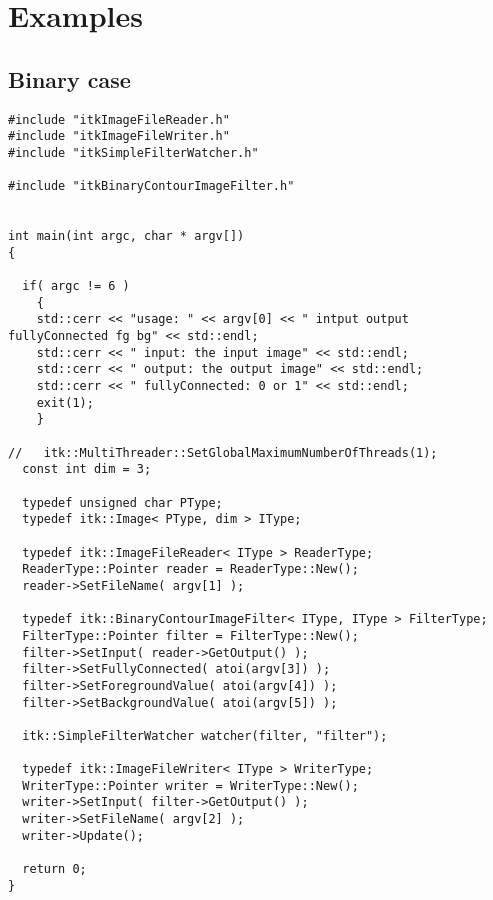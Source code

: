 \documentclass{InsightArticle}
\begin{document}
\section{Examples}
\subsection{Binary case}

\small \begin{verbatim}
#include "itkImageFileReader.h"
#include "itkImageFileWriter.h"
#include "itkSimpleFilterWatcher.h"

#include "itkBinaryContourImageFilter.h"


int main(int argc, char * argv[])
{

  if( argc != 6 )
    {
    std::cerr << "usage: " << argv[0] << " intput output fullyConnected fg bg" << std::endl;
    std::cerr << " input: the input image" << std::endl;
    std::cerr << " output: the output image" << std::endl;
    std::cerr << " fullyConnected: 0 or 1" << std::endl;
    exit(1);
    }

//   itk::MultiThreader::SetGlobalMaximumNumberOfThreads(1);
  const int dim = 3;
  
  typedef unsigned char PType;
  typedef itk::Image< PType, dim > IType;

  typedef itk::ImageFileReader< IType > ReaderType;
  ReaderType::Pointer reader = ReaderType::New();
  reader->SetFileName( argv[1] );

  typedef itk::BinaryContourImageFilter< IType, IType > FilterType;
  FilterType::Pointer filter = FilterType::New();
  filter->SetInput( reader->GetOutput() );
  filter->SetFullyConnected( atoi(argv[3]) );
  filter->SetForegroundValue( atoi(argv[4]) );
  filter->SetBackgroundValue( atoi(argv[5]) );

  itk::SimpleFilterWatcher watcher(filter, "filter");

  typedef itk::ImageFileWriter< IType > WriterType;
  WriterType::Pointer writer = WriterType::New();
  writer->SetInput( filter->GetOutput() );
  writer->SetFileName( argv[2] );
  writer->Update();

  return 0;
}
\end{verbatim} \normalsize
\end{document}
